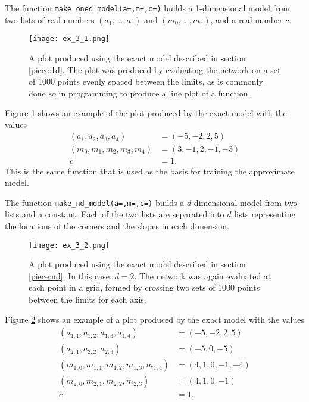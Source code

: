 \documentclass{somasmsc}
\begin{document}
\begin{exa}
The function \verb|make_oned_model(a=,m=,c=)| builds a 1-dimensional model from two lists of real numbers $\left(a_1, \dots, a_r\right)$ and $\left(m_0, \dots, m_r\right)$, and a real number $c$.

\begin{figure}[H]\label{piece:ex_3_1}
\begin{center}
\texttt{[image: ex\_3\_1.png]}
\end{center}
\caption{A plot produced using the exact model described in section \ref{piece:1d}. The plot was produced by evaluating the network on a set of 1000 points evenly spaced between the limits, as is commonly done so in programming to produce a line plot of a function.}
\end{figure}

Figure \ref{piece:ex_3_1} shows an example of the plot produced by the exact model with the values
\begin{align*}
    \left(a_1, a_2, a_3, a_4\right) &= \left(-5, -2, 2, 5\right) \\
    \left(m_0, m_1, m_2, m_3, m_4\right) &= \left(3, -1, 2, -1, -3\right) \\
    c &= 1.
\end{align*}
This is the same function that is used as the basis for training the approximate model.
\end{exa}

\begin{exa}
The function \verb|make_nd_model(a=,m=,c=)| builds a $d$-dimensional model from two lists and a constant. Each of the two lists are separated into $d$ lists representing the locations of the corners and the slopes in each dimension.

\begin{figure}[H]\label{piece:ex_3_2}
\begin{center}
\texttt{[image: ex\_3\_2.png]}
\end{center}
\caption{A plot produced using the exact model described in section \ref{piece:nd}. In this case, $d=2$. The network was again evaluated at each point in a grid, formed by crossing two sets of 1000 points between the limits for each axis.}
\end{figure}

Figure \ref{piece:ex_3_2} shows an example of a plot produced by the exact model with the values
\begin{align*}
    \left(a_{1,1}, a_{1,2}, a_{1,3}, a_{1,4}\right) &= \left(-5, -2, 2, 5\right) \\
    \left(a_{2,1}, a_{2,2}, a_{2,3}\right) &= \left(-5, 0, -5\right) \\
    \left(m_{1,0}, m_{1,1}, m_{1,2}, m_{1,3}, m_{1,4}\right) &= \left(4, 1, 0, -1, -4\right) \\
    \left(m_{2,0}, m_{2,1}, m_{2,2}, m_{2,3}\right) &= \left(4, 1, 0, -1\right) \\
    c &= 1.
\end{align*}
\end{exa}
\end{document}
